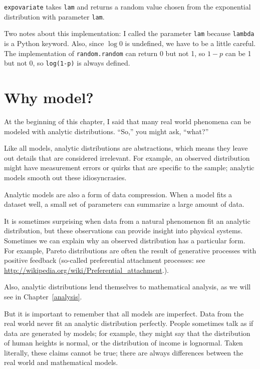 \documentclass[12pt]{book}
\begin{document}
\verb"expovariate" takes \verb"lam" and returns a random value chosen
from the exponential distribution with parameter \verb"lam".

Two notes about this implementation:
I called the parameter \verb"lam" because \verb"lambda" is a Python
keyword.  Also, since $\log 0$ is undefined, we have to
be a little careful.  The implementation of \verb"random.random"
can return 0 but not 1, so $1 - p$ can be 1 but not 0, so
\verb"log(1-p)" is always defined.  


\section{Why model?}

At the beginning of this chapter, I said that many real world phenomena
can be modeled with analytic distributions.  ``So,'' you might ask,
``what?''  

Like all models, analytic distributions are abstractions, which
means they leave out details that are considered irrelevant.
For example, an observed distribution might have measurement errors
or quirks that are specific to the sample; analytic models smooth
out these idiosyncrasies.

Analytic models are also a form of data compression.  When a model
fits a dataset well, a small set of parameters can summarize a
large amount of data.

It is sometimes surprising when data from a natural phenomenon fit an
analytic distribution, but these observations can provide insight
into physical systems.  Sometimes we can explain why an observed
distribution has a particular form.  For example, Pareto distributions
are often the result of generative processes with positive feedback
(so-called preferential attachment processes: see
\url{http://wikipedia.org/wiki/Preferential_attachment}.).

Also, analytic distributions lend themselves to mathematical
analysis, as we will see in Chapter~\ref{analysis}.

But it is important to remember that all models are imperfect.
Data from the real world never fit an analytic distribution perfectly.
People sometimes talk as if data are generated by models; for example,
they might say that the distribution of human heights is normal,
or the distribution of income is lognormal.  Taken literally, these
claims cannot be true; there are always differences between the
real world and mathematical models.
\end{document}
